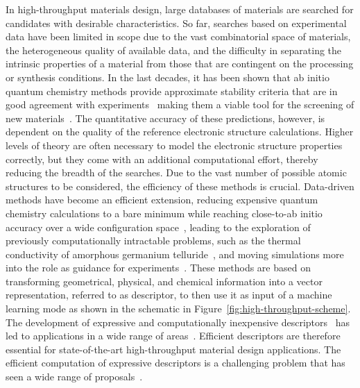 In high-throughput materials design, large databases of materials are searched for candidates with desirable characteristics.
So far, searches based on experimental data have been limited in scope due to the vast combinatorial space of materials, the heterogeneous quality of available data, and the difficulty in separating the intrinsic properties of a material from those that are contingent on the processing or synthesis conditions.
In the last decades, it has been shown that ab initio quantum chemistry methods provide approximate stability criteria that are in good agreement with experiments~\cite{jansen2015conceptual} making them a viable tool for the screening of new materials~\cite{ceder1998identification, andersson2006toward, yang2012search, gomez2016design}.
The quantitative accuracy of these predictions, however, is dependent on the quality of the reference electronic structure calculations. 
Higher levels of theory are often necessary to model the electronic structure properties correctly, but they come with an additional computational effort, thereby reducing the breadth of the searches.
Due to the vast number of possible atomic structures to be considered, the efficiency of these methods is crucial.
Data-driven methods have become an efficient extension, reducing expensive quantum chemistry calculations to a bare minimum while reaching close-to-ab initio accuracy over a wide configuration space~\cite{bartok2018machine}, leading to the exploration of previously computationally intractable problems, such as the thermal conductivity of amorphous germanium telluride~\cite{sosso2012thermal}, and moving simulations more into the role as guidance for experiments~\cite{chang_simulations_2023}.
These methods are based on transforming geometrical, physical, and chemical information into a vector representation, referred to as descriptor, to then use it as input of a machine learning mode as shown in the schematic in Figure~\ref{fig:high-throughput-scheme}.
The development of expressive and computationally inexpensive descriptors~\cite{behl11jcp, bart+13prb} has led to applications in a wide range of areas~\cite{mansouri2018machine, sosso2018understanding, basdogan2019machine}. 
Efficient descriptors are therefore essential for state-of-the-art high-throughput material design applications.
The efficient computation of expressive descriptors is a challenging problem that has seen a wide range of proposals~\cite{behl11jcp, rupp2012fast, bart+13prb, huo2017unified}.

